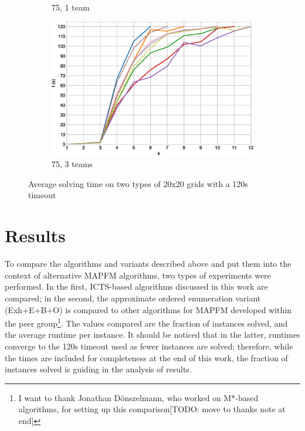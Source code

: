 \documentclass[english,10pt]{article}
\begin{document}
\begin{figure}[b]
\begin{subfigure}{0.44\textwidth}
		\caption{75, 1 team}
		\label{fig:75-1}
	\end{subfigure}
	\begin{subfigure}{0.44\textwidth}
		\centering
		\includegraphics[width=\linewidth]{img/results/relative-comparison/75-3}
		\caption{75, 3 teams}
		\label{fig:75-3}
	\end{subfigure}
	\caption{Average solving time on two types of 20x20 grids with a 120s timeout}
	\label{fig:times}
\end{figure}
\restoregeometry


	
	\section{Results}
	\label{experiments}
	To compare the algorithms and variants described above and put them into the context of alternative MAPFM algorithms, two types of experiments were performed. In the first, ICTS-based algorithms discussed in this work are compared; in the second, the approximate ordered enumeration variant (Exh+E+B+O) is compared to other algorithms for MAPFM developed within the peer group\footnote{I want to thank Jonathan Dönszelmann, who worked on M*-based algorithms, for setting up this comparison[TODO: move to thanks note at end]}. The values compared are the fraction of instances solved, and the average runtime per instance. It should be noticed that in the latter, runtimes converge to the 120s timeout used as fewer instances are solved; therefore, while the times are included for completeness at the end of this work, the fraction of instances solved is guiding in the analysis of results.
\end{document}
